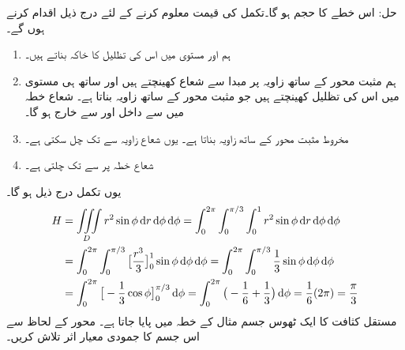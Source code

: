 حل:\quad
اس خطے کا حجم  ہو گا۔تکمل کی قیمت معلوم کرنے کے لئے درج ذیل اقدام کرنے ہوں گے۔
\begin{enumerate}[1.]
\item
{}\quad
ہم  اور مستوی  میں اس کی تظلیل   کا خاکہ بناتے ہیں۔
\item
{}\quad
ہم مثبت  محور کے ساتھ  زاویہ پر  مبدا سے شعاع   کھینچتے ہیں اور ساتھ ہی   مستوی میں اس کی تظلیل   کھینچتے ہیں جو مثبت  محور کے ساتھ زاویہ  بناتا ہے۔ شعاع  خطہ میں  سے داخل اور  سے خارج ہو گا۔
\item
{}\quad
 مخروط   مثبت  محور کے ساتھ  زاویہ  بناتا ہے۔ یوں شعاع   زاویہ  سے  تک چل سکتی ہے۔
\item
{}\quad
شعاع  خطہ  پر    سے  تک چلتی ہے۔
\end{enumerate}
یوں تکمل درج ذیل ہو گا۔
\begin{align*}
H&=\iiint\limits_D r^2\sin\phi\dif r\dif \phi\dif \phi=\int_{0}^{2\pi}\int_{0}^{\pi/3}\int_{0}^{1} r^2\sin\phi\dif r\dif \phi\dif \phi\\
&=\int_{0}^{2\pi}\int_{0}^{\pi/3}\big[\frac{r^3}{3}\big]_0^1 \sin\phi\dif \phi\dif\phi=\int_{0}^{2\pi}\int_{0}^{\pi/3}\frac{1}{3} \sin\phi\dif\phi\dif\phi\\
&=\int_{0}^{2\pi}\big[-\frac{1}{3}\cos\phi\big]_{0}^{\pi/3} \dif\phi=\int_{0}^{2\pi} \big(-\frac{1}{6}+\frac{1}{3}\big)\dif\phi=\frac{1}{6}(2\pi)=\frac{\pi}{3}
\end{align*}
مستقل کثافت  کا ایک ٹھوس جسم مثال  کے خطہ  میں پایا جاتا ہے۔ محور  کے لحاظ سے اس جسم کا جمودی معیار اثر تلاش کریں۔

